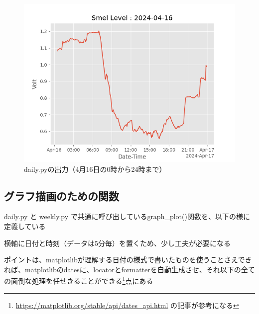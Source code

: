 \documentclass[12pt,a4j]{jsbook}
\begin{document}
\begin{figure}[htbp]
	\begin{minipage}[b]{1.0\linewidth}
		\centering
		\includegraphics[keepaspectratio, scale=0.8]{figs/png/2024-04-16.png}
		\caption{daily.pyの出力（4月16日の0時から24時まで）}
	\end{minipage}
\end{figure}

\subsection{グラフ描画のための関数}

daily.py と weekly.py で共通に呼び出しているgraph\_plot()関数を、以下の様に定義している

横軸に日付と時刻（データは5分毎）を置くため、少し工夫が必要になる

ポイントは、matplotlibが理解する日付の様式で書いたものを使うことさえできれば、matplotlibのdatesに、locatorとformatterを自動生成させ、それ以下の全ての面倒な処理を任せきることができる\footnote{\url{https://matplotlib.org/stable/api/dates_api.html}
	の記事が参考になる}点にある
\end{document}
